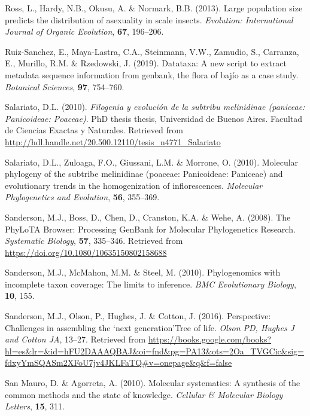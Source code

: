 \documentclass[]{article}
\begin{document}
\leavevmode\hypertarget{ref-ross2013large}{}%
Ross, L., Hardy, N.B., Okusu, A. \& Normark, B.B. (2013). Large population size predicts the distribution of asexuality in scale insects. \emph{Evolution: International Journal of Organic Evolution}, \textbf{67}, 196--206.

\leavevmode\hypertarget{ref-ruiz2019datataxa}{}%
Ruiz-Sanchez, E., Maya-Lastra, C.A., Steinmann, V.W., Zamudio, S., Carranza, E., Murillo, R.M. \& Rzedowski, J. (2019). Datataxa: A new script to extract metadata sequence information from genbank, the flora of bajío as a case study. \emph{Botanical Sciences}, \textbf{97}, 754--760.

\leavevmode\hypertarget{ref-salariato2010filogenia}{}%
Salariato, D.L. (2010). \emph{Filogenia y evolución de la subtribu melinidinae (paniceae: Panicoideae: Poaceae)}. PhD thesis thesis, Universidad de Buenos Aires. Facultad de Ciencias Exactas y Naturales. Retrieved from \url{http://hdl.handle.net/20.500.12110/tesis_n4771_Salariato}

\leavevmode\hypertarget{ref-salariato2010molecular}{}%
Salariato, D.L., Zuloaga, F.O., Giussani, L.M. \& Morrone, O. (2010). Molecular phylogeny of the subtribe melinidinae (poaceae: Panicoideae: Paniceae) and evolutionary trends in the homogenization of inflorescences. \emph{Molecular Phylogenetics and Evolution}, \textbf{56}, 355--369.

\leavevmode\hypertarget{ref-sanderson2008phylota}{}%
Sanderson, M.J., Boss, D., Chen, D., Cranston, K.A. \& Wehe, A. (2008). The PhyLoTA Browser: Processing GenBank for Molecular Phylogenetics Research. \emph{Systematic Biology}, \textbf{57}, 335--346. Retrieved from \url{https://doi.org/10.1080/10635150802158688}

\leavevmode\hypertarget{ref-sanderson2010phylogenomics}{}%
Sanderson, M.J., McMahon, M.M. \& Steel, M. (2010). Phylogenomics with incomplete taxon coverage: The limits to inference. \emph{BMC Evolutionary Biology}, \textbf{10}, 155.

\leavevmode\hypertarget{ref-sanderson2016perspective}{}%
Sanderson, M.J., Olson, P., Hughes, J. \& Cotton, J. (2016). Perspective: Challenges in assembling the `next generation'Tree of life. \emph{Olson PD, Hughes J and Cotton JA}, 13--27. Retrieved from \url{https://books.google.com/books?hl=es\&lr=\&id=hFU2DAAAQBAJ\&oi=fnd\&pg=PA13\&ots=2Oa_TVGCic\&sig=fdxyYmSQASm2XFoU7jv4JKLFaTQ\#v=onepage\&q\&f=false}

\leavevmode\hypertarget{ref-san2010molecular}{}%
San Mauro, D. \& Agorreta, A. (2010). Molecular systematics: A synthesis of the common methods and the state of knowledge. \emph{Cellular \& Molecular Biology Letters}, \textbf{15}, 311.
\end{document}

